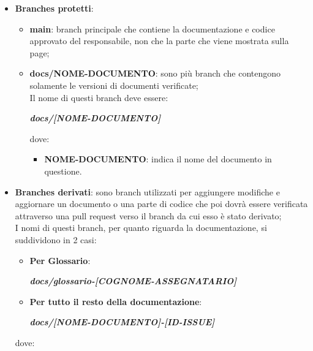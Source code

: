 \begin{itemize}
    \item \textbf{Branches protetti}:
          \begin{itemize}
              \item \textbf{main}: branch principale che contiene la documentazione e codice approvato del responsabile, non che la parte che viene mostrata sulla page;
              \item \textbf{docs/NOME-DOCUMENTO}: sono più branch che contengono solamente le versioni di documenti verificate;\\
                    Il nome di questi branch deve essere:
                    \begin{center}
                        \textbf{\textit{docs/[NOME-DOCUMENTO]}}
                    \end{center}
                    dove:
                    \begin{itemize}
                        \item \textbf{NOME-DOCUMENTO}: indica il nome del documento in questione.
                    \end{itemize}
          \end{itemize}
    \item \textbf{Branches derivati}: sono branch utilizzati per aggiungere modifiche e aggiornare un documento o una parte di codice che poi dovrà essere verificata
          attraverso una pull request verso il branch da cui esso è stato derivato;\\
          I nomi di questi branch, per quanto riguarda la documentazione, si suddividono in 2 casi:
          \begin{itemize}
              \item \textbf{Per Glossario}:
                    \begin{center}
                        \textbf{\textit{docs/glossario-[COGNOME-ASSEGNATARIO]}}
                    \end{center}
              \item \textbf{Per tutto il resto della documentazione}:
                    \begin{center}
                        \textbf{\textit{docs/[NOME-DOCUMENTO]-[ID-ISSUE]}}
                    \end{center}
          \end{itemize}
          dove:


\end{itemize}

